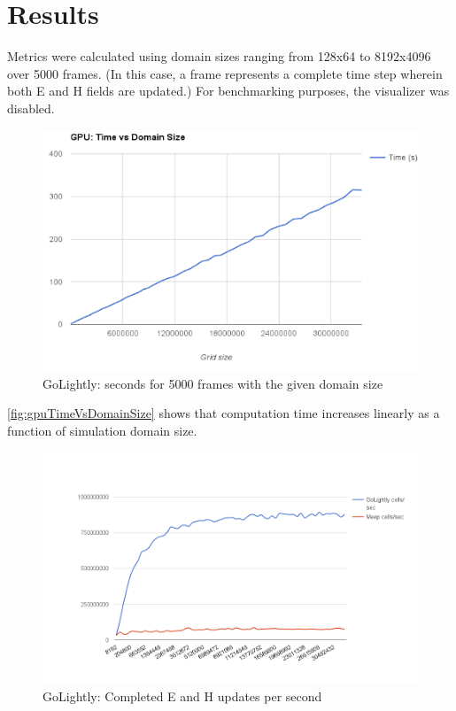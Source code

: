 \chapter{Results} \label{ch:conclusions}

Metrics were calculated using domain sizes ranging from 128x64 to 8192x4096 over 5000 frames. (In this case, a frame represents a complete time step wherein both E and H fields are updated.) For benchmarking purposes, the visualizer was disabled.


\begin{figure}[H]
	\centering
	\includegraphics[width=\textwidth,
	keepaspectratio]{gpu_time_vs_domain_size.png}
	\caption{GoLightly: seconds for 5000 frames with the given domain size}
	\label{fig:gpuTimeVsDomainSize}
\end{figure}

\autoref{fig:gpuTimeVsDomainSize} shows that computation time increases linearly as a function of simulation domain size.


\begin{figure}[H]
	\centering
	\includegraphics[width=\textwidth,
	keepaspectratio]{cells-per-second.png}
	\caption{GoLightly: Completed E and H updates per second}
	\label{fig:gridSizeVsComputeTime}
\end{figure}

